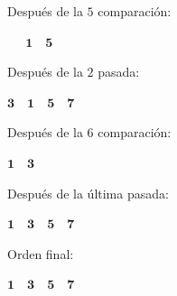 \documentclass[ebook,oneside]{memoir}
\newcommand{\bolds}[1]{\boldsymbol{#1}}
\begin{document}
        \vspace*{-0.1cm}

        \begin{minipage}{.6\textwidth}
        Despu\'{e}s de la $5$ comparaci\'{o}n:
        \end{minipage}\hfill
        \begin{minipage}{.3\textwidth}
        $\bolds{\quad\;\, 1\quad 5}$
        \end{minipage}

        \vspace*{-0.1cm}

        \begin{minipage}{.6\textwidth}
        Despu\'{e}s de la $2$ pasada:
        \end{minipage}\hfill
        \begin{minipage}{.3\textwidth}
        $\bolds{3\quad 1\quad 5\quad 7}$
        \end{minipage}

        \vspace*{0.2cm}

        \begin{minipage}{.6\textwidth}
        Despu\'{e}s de la $6$ comparaci\'{o}n:
        \end{minipage}\hfill
        \begin{minipage}{.3\textwidth}
        $\bolds{1\quad 3}$
        \end{minipage}

        \vspace*{-0.1cm}

        \begin{minipage}{.6\textwidth}
        Despu\'{e}s de la \'{u}ltima pasada:
        \end{minipage}\hfill
        \begin{minipage}{.3\textwidth}
        $\bolds{1\quad 3\quad 5\quad 7}$
        \end{minipage}

        \vspace*{0.2cm}

        \begin{minipage}{.6\textwidth}
        Orden final:
        \end{minipage}\hfill
        \begin{minipage}{.3\textwidth}
        $\bolds{1\quad 3\quad 5\quad 7}$

        \end{minipage}
\end{document}
